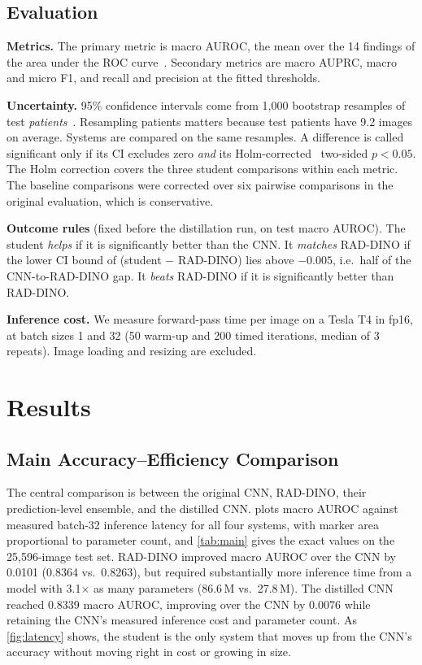 \documentclass[conference]{IEEEtran}
\begin{document}
\subsection{Evaluation}
\textbf{Metrics.} The primary metric is macro AUROC, the mean over the 14 findings of the area under the ROC curve~\cite{hanley1982meaning}. Secondary metrics are macro AUPRC, macro and micro F1, and recall and precision at the fitted thresholds.

\textbf{Uncertainty.} 95\% confidence intervals come from 1,000 bootstrap resamples of test \emph{patients}~\cite{efron1993bootstrap}. Resampling patients matters because test patients have 9.2 images on average. Systems are compared on the same resamples. A difference is called significant only if its CI excludes zero \emph{and} its Holm-corrected~\cite{holm1979simple} two-sided $p<0.05$. The Holm correction covers the three student comparisons within each metric. The baseline comparisons were corrected over six pairwise comparisons in the original evaluation, which is conservative.

\textbf{Outcome rules} (fixed before the distillation run, on test macro AUROC). The student \emph{helps} if it is significantly better than the CNN. It \emph{matches} RAD-DINO if the lower CI bound of (student $-$ RAD-DINO) lies above $-0.005$, i.e.\ half of the CNN-to-RAD-DINO gap. It \emph{beats} RAD-DINO if it is significantly better than RAD-DINO.

\textbf{Inference cost.} We measure forward-pass time per image on a Tesla T4 in fp16, at batch sizes 1 and 32 (50 warm-up and 200 timed iterations, median of 3 repeats). Image loading and resizing are excluded.

\section{Results}
\label{sec:results}

\subsection{Main Accuracy--Efficiency Comparison}

The central comparison is between the original CNN, RAD-DINO, their prediction-level ensemble, and the distilled CNN.  plots macro AUROC against measured batch-32 inference latency for all four systems, with marker area proportional to parameter count, and \cref{tab:main} gives the exact values on the 25,596-image test set. RAD-DINO improved macro AUROC over the CNN by 0.0101 (0.8364 vs.\ 0.8263), but required substantially more inference time from a model with 3.1$\times$ as many parameters (86.6\,M vs.\ 27.8\,M). The distilled CNN reached 0.8339 macro AUROC, improving over the CNN by 0.0076 while retaining the CNN's measured inference cost and parameter count. As \cref{fig:latency} shows, the student is the only system that moves up from the CNN's accuracy without moving right in cost or growing in size.
\end{document}
